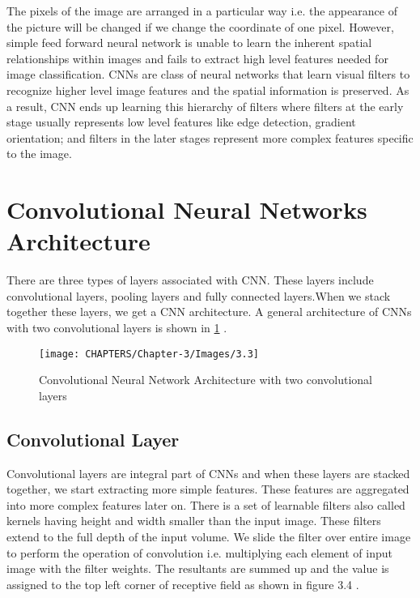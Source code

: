 The pixels of the image are arranged in a particular 
way i.e. the appearance of the picture will be changed 
if we change the coordinate of one pixel. However, simple feed 
forward neural network is unable to learn the inherent spatial 
relationships within images and fails to extract high level features 
needed for image classification. CNNs are class
of neural networks that learn visual filters to recognize higher level 
image features and the spatial information is preserved. As a result, CNN ends up learning this hierarchy of filters where filters at the early stage 
usually represents low level features like edge detection, gradient orientation; and filters in the later stages represent more complex features specific to the image.

\section{Convolutional Neural Networks Architecture}

There are three types of layers associated with CNN. These layers include convolutional layers, pooling layers and fully connected layers.When we stack together these layers, we get a CNN architecture. A general
architecture of CNNs with two convolutional layers is shown in \ref{fig:3.3} \cite{chap_3_article:2}.

\begin{figure}[H]
	\centering
		\texttt{[image: CHAPTERS/Chapter-3/Images/3.3]}
	\caption{Convolutional Neural Network Architecture with two convolutional layers}
	\label{fig:3.3}
\end{figure}

\subsection{Convolutional Layer}
Convolutional layers are integral part of CNNs and when these layers are stacked
together, we start extracting more simple 
features. These features are aggregated into more complex features later 
on. There is a set of learnable filters also called kernels having
height and width smaller than the input image. These filters extend 
to the full depth of the input volume. We slide the filter over entire 
image to perform the operation of convolution i.e. multiplying each element of input image with the filter weights. The resultants are 
summed up and the value is assigned to the top left corner of receptive field 
as shown in figure 3.4 \cite{chap_3_article:4}.

